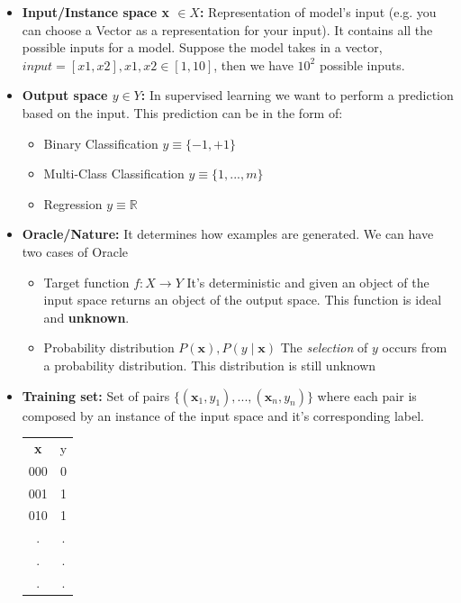 \begin{itemize}
\item \textbf{Input/Instance space x $\in X$:}
Representation of model's input (e.g. you can choose a Vector as a representation for your input). It contains all the possible inputs for a model. Suppose the model takes in a vector, $input = [x1, x2], x1,x2 \in [1,10]$, then we have $10^2$ possible inputs.
\item \textbf{Output space $y \in Y$:}
In supervised learning we want to perform a prediction based on the input. This prediction can be in the form of:
\begin{itemize}
    \item Binary Classification $y \equiv \{-1, +1\}$
    \item Multi-Class Classification $y \equiv \{1,...,m\}$
    \item Regression $y \equiv \mathbb{R}$
\end{itemize}
\item \textbf{Oracle/Nature:}
It determines how examples are generated. We can have two cases of Oracle
\begin{itemize}
    \item Target function $f: X \rightarrow Y$ It's deterministic and given an object of the input space returns an object of the output space. This function is ideal and \textbf{unknown}.
    \item Probability distribution $P(\textbf{x}), P(y\mid\textbf{x})$ The \textit{selection} of $y$ occurs from a probability distribution. This distribution is still unknown
\end{itemize}
\item \textbf{Training set:}
Set of pairs $\{(\textbf{x}_{1}, y_{1}), ..., (\textbf{x}_{n}, y_{n}) \}$ where each pair is composed by an instance of the input space and it's corresponding label.
\begin{center}
    \begin{tabular}{c|c}
     \textbf{x} & y\\
     000&0  \\
     001&1 \\
     010&1 \\
     .&. \\
     .&. \\
     .&.\\
    \end{tabular}
\end{center}


\end{itemize}
